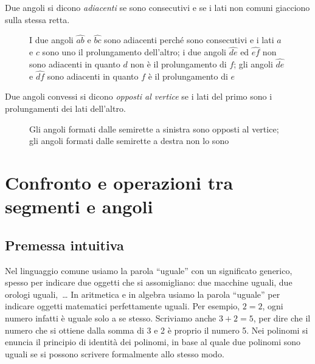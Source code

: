\begin{definizione}
Due angoli si dicono \emph{adiacenti} se sono consecutivi e se i lati non comuni giacciono sulla stessa retta.
\end{definizione}

\begin{figure}[htb]
 \centering 
\caption{I due angoli $\widehat{ab}$ e $\widehat{bc}$ sono adiacenti perché sono consecutivi e i lati $a$ e $c$ sono uno il prolungamento dell'altro; i due angoli $\widehat{de}$ ed $\widehat{ef}$ non sono adiacenti in quanto $d$ non è il prolungamento di $f$; gli angoli $\widehat{de}$ e $\widehat{df}$ sono adiacenti in quanto $f$ è il prolungamento di $e$}\label{fig:1.23}
\end{figure}

\begin{definizione}
Due angoli convessi si dicono \emph{opposti al vertice} se i lati del primo sono i prolungamenti dei lati dell'altro.
\end{definizione}

\begin{figure}[htb]
 \centering 
\caption{Gli angoli formati dalle semirette a sinistra sono opposti al vertice; gli angoli formati dalle semirette a destra non lo sono}\label{fig:1.24}
\end{figure}


\section{Confronto e operazioni tra segmenti e angoli}

\subsection{Premessa intuitiva}

Nel linguaggio comune usiamo la parola ``uguale'' con un significato generico, spesso per indicare due oggetti che si assomigliano: due macchine uguali, due orologi uguali,~\ldots{} In aritmetica e in algebra usiamo la parola ``uguale'' per indicare oggetti matematici perfettamente uguali. Per esempio, $2=2$, ogni numero infatti è uguale solo a se stesso. Scriviamo anche $3+2=5$, per dire che il numero che si ottiene dalla somma di 3 e 2 è proprio il numero 5. Nei polinomi si enuncia il principio di identità dei polinomi, in base al quale due polinomi sono uguali se si possono scrivere formalmente allo stesso modo.

